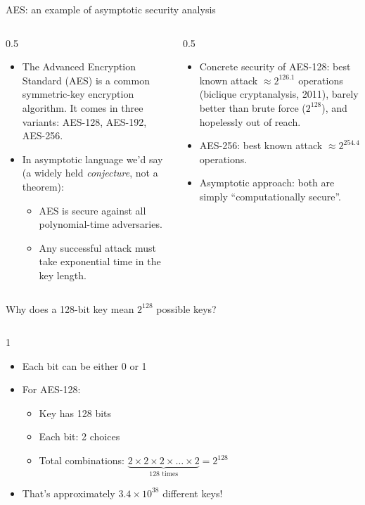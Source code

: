 \ifdefined\PRESENTATION\else\PassOptionsToClass{handout}{beamer}\fi\documentclass[aspectratio=169, lualatex]{beamer}
\begin{document}
\begin{frame}{AES: an example of asymptotic security analysis}
	\begin{columns}[c]
		\begin{column}{0.5\textwidth}
			\begin{itemize}
				\item The Advanced Encryption Standard (AES) is a common symmetric-key encryption algorithm. It comes in three variants: AES-128, AES-192, AES-256.
				\item In asymptotic language we'd say (a widely held \textit{conjecture}, not a theorem):
				      \begin{itemize}
					      \item AES is secure against all polynomial-time adversaries.
					      \item Any successful attack must take exponential time in the key length.
				      \end{itemize}
			\end{itemize}
		\end{column}
		\begin{column}{0.5\textwidth}
			\begin{itemize}
				\item Concrete security of AES-128: best known attack $\approx 2^{126.1}$ operations (biclique cryptanalysis, 2011), barely better than brute force ($2^{128}$), and hopelessly out of reach.
				\item AES-256: best known attack $\approx 2^{254.4}$ operations.
				\item Asymptotic approach: both are simply ``computationally secure''.
			\end{itemize}
		\end{column}
	\end{columns}
\end{frame}

\begin{frame}{Why does a 128-bit key mean $2^{128}$ possible keys?}
	\begin{columns}[c]
		\begin{column}{1\textwidth}
			\begin{itemize}
				\item Each bit can be either 0 or 1
				\item For AES-128:
				      \begin{itemize}
					      \item Key has 128 bits
					      \item Each bit: 2 choices
					      \item Total combinations: $\underbrace{2 \times 2 \times 2 \times \ldots \times 2}_{128 \text{ times}} = 2^{128}$
				      \end{itemize}
				\item That's approximately $3.4 \times 10^{38}$ different keys!
			\end{itemize}
		\end{column}
	\end{columns}
\end{frame}
\end{document}
